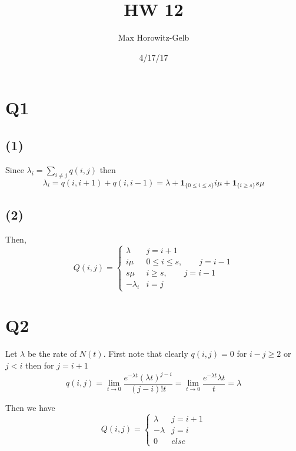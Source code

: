 \documentclass{article}
\title{HW 12}
\author{Max Horowitz-Gelb}
\date{4/17/17}
\begin{document}
\maketitle
\section*{Q1}
\subsection*{(1)}
Since $\lambda_i = \sum_{i \neq j} q(i,j)$ then
$$
\lambda_i = q(i,i+1) + q(i, i-1) = \lambda + \mathbf{1}_{\{0 \leq i \leq s\}}i\mu + \mathbf{1}_{\{i \geq s\}}s\mu 
$$

\subsection*{(2)}
Then,
$$
Q(i,j) = 
\begin{cases}
\lambda & j = i +1 \\
i \mu  & 0 \leq i \leq s, \qquad j = i -1 \\
s \mu & i \geq s, \qquad j = i -1 \\
-\lambda_i & i = j 
\end{cases}
$$

\section*{Q2}
Let $\lambda$ be the rate of $N(t)$.
First note that clearly 
$q(i,j) = 0$ for $i -j \geq 2$ or $j < i$
then for $j = i + 1$
$$
q(i,j) = \lim_{t \to 0} \frac{e^{-\lambda t}(\lambda t)^{j-i}}{(j-i)! t} = \lim_{t \to 0} \frac{e^{-\lambda t}\lambda t}{t} = \lambda
$$

Then we have
$$
Q(i,j) = \begin{cases}
\lambda & j = i +1 \\
-\lambda & j = i \\
0 & else
\end{cases}
$$
\end{document}
